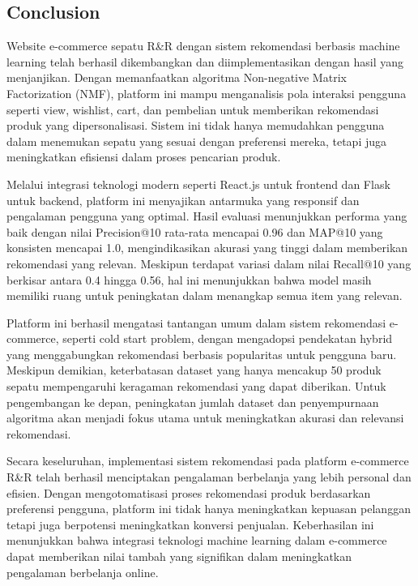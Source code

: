 \documentclass[journal,article,submit,pdftex,moreauthors]{Definitions/mdpi}
\begin{document}




\subsection{Conclusion}

Website e-commerce sepatu R\&R dengan sistem rekomendasi berbasis machine learning telah berhasil dikembangkan dan diimplementasikan dengan hasil yang menjanjikan. Dengan memanfaatkan algoritma Non-negative Matrix Factorization (NMF), platform ini mampu menganalisis pola interaksi pengguna seperti view, wishlist, cart, dan pembelian untuk memberikan rekomendasi produk yang dipersonalisasi. Sistem ini tidak hanya memudahkan pengguna dalam menemukan sepatu yang sesuai dengan preferensi mereka, tetapi juga meningkatkan efisiensi dalam proses pencarian produk.

Melalui integrasi teknologi modern seperti React.js untuk frontend dan Flask untuk backend, platform ini menyajikan antarmuka yang responsif dan pengalaman pengguna yang optimal. Hasil evaluasi menunjukkan performa yang baik dengan nilai Precision@10 rata-rata mencapai 0.96 dan MAP@10 yang konsisten mencapai 1.0, mengindikasikan akurasi yang tinggi dalam memberikan rekomendasi yang relevan. Meskipun terdapat variasi dalam nilai Recall@10 yang berkisar antara 0.4 hingga 0.56, hal ini menunjukkan bahwa model masih memiliki ruang untuk peningkatan dalam menangkap semua item yang relevan.

Platform ini berhasil mengatasi tantangan umum dalam sistem rekomendasi e-commerce, seperti cold start problem, dengan mengadopsi pendekatan hybrid yang menggabungkan rekomendasi berbasis popularitas untuk pengguna baru. Meskipun demikian, keterbatasan dataset yang hanya mencakup 50 produk sepatu mempengaruhi keragaman rekomendasi yang dapat diberikan. Untuk pengembangan ke depan, peningkatan jumlah dataset dan penyempurnaan algoritma akan menjadi fokus utama untuk meningkatkan akurasi dan relevansi rekomendasi.

Secara keseluruhan, implementasi sistem rekomendasi pada platform e-commerce R\&R telah berhasil menciptakan pengalaman berbelanja yang lebih personal dan efisien. Dengan mengotomatisasi proses rekomendasi produk berdasarkan preferensi pengguna, platform ini tidak hanya meningkatkan kepuasan pelanggan tetapi juga berpotensi meningkatkan konversi penjualan. Keberhasilan ini menunjukkan bahwa integrasi teknologi machine learning dalam e-commerce dapat memberikan nilai tambah yang signifikan dalam meningkatkan pengalaman berbelanja online.
\end{document}
